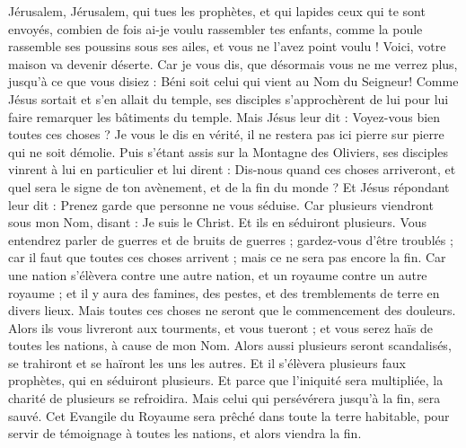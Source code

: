 \begin{multicols}{2}
Jérusalem, Jérusalem, qui tues les prophètes, et qui lapides ceux qui te sont envoyés, combien de fois ai-je voulu rassembler tes enfants, comme la poule rassemble ses poussins sous ses ailes, et vous ne l'avez point voulu !
Voici, votre maison va devenir déserte.
Car je vous dis, que désormais vous ne me verrez plus, jusqu'à ce que vous disiez : Béni soit celui qui vient au Nom du Seigneur!
\VerseOne{}Comme Jésus sortait et s'en allait du temple, ses disciples s'approchèrent de lui pour lui faire remarquer les bâtiments du temple.
Mais Jésus leur dit : Voyez-vous bien toutes ces choses ? Je vous le dis en vérité, il ne restera pas ici pierre sur pierre qui ne soit démolie.
Puis s'étant assis sur la Montagne des Oliviers, ses disciples vinrent à lui en particulier et lui dirent : Dis-nous quand ces choses arriveront, et quel sera le signe de ton avènement, et de la fin du monde ?
Et Jésus répondant leur dit : Prenez garde que personne ne vous séduise.
Car plusieurs viendront sous mon Nom, disant : Je suis le Christ. Et ils en séduiront plusieurs.
Vous entendrez parler de guerres et de bruits de guerres ; gardez-vous d’être troublés ; car il faut que toutes ces choses arrivent ; mais ce ne sera pas encore la fin.
Car une nation s'élèvera contre une autre nation, et un royaume contre un autre royaume ; et il y aura des famines, des pestes, et des tremblements de terre en divers lieux.
Mais toutes ces choses ne seront que le commencement des douleurs.
Alors ils vous livreront aux tourments, et vous tueront ; et vous serez haïs de toutes les nations, à cause de mon Nom.
Alors aussi plusieurs seront scandalisés, se trahiront et se haïront les uns les autres.
Et il s’élèvera plusieurs faux prophètes, qui en séduiront plusieurs.
Et parce que l'iniquité sera multipliée, la charité de plusieurs se refroidira.
Mais celui qui persévérera jusqu'à la fin, sera sauvé.
Cet Evangile du Royaume sera prêché dans toute la terre habitable, pour servir de témoignage à toutes les nations, et alors viendra la fin.

\end{multicols}
